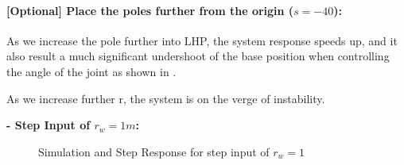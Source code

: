 \documentclass{tron}
\begin{document}
\paragraph{[Optional] Place the poles further from the origin ($s=-40$):}
As we increase the pole further into LHP, the system response speeds up, and it also result a much significant undershoot of the base position when controlling the angle of the joint as shown in . 

As we increase further r, the system is on the verge of instability. 

\textbf{- Step Input of $r_{w}=1\unit{m}$:}
\begin{figure}[H]
	\centering
	 \quad
	\caption{Simulation and Step Response for step input of $r_w=1$}
	\label{fig:p6a:step-response:rw:40}
\end{figure}
\end{document}
